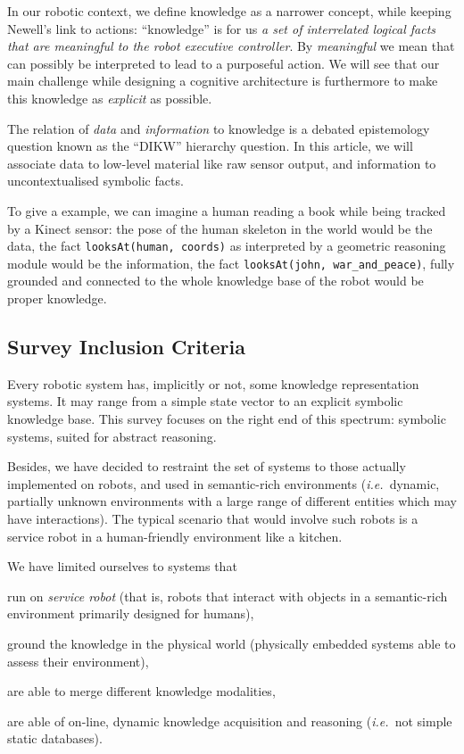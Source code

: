 \documentclass{IEEEtran}
\newcommand{\ie}{{\textit{i.e.\ }}}
\newcommand{\concept}[1]{{\footnotesize \texttt{#1}}}
\begin{document}
In our robotic context, we define knowledge as a narrower concept, while
keeping Newell's link to actions: ``knowledge'' is for us  \emph{a set of
interrelated logical facts that are meaningful to the robot executive
controller}. By \emph{meaningful} we mean that can possibly be interpreted to
lead to a purposeful action. We will see that our main challenge while
designing a cognitive architecture is furthermore to make this knowledge as
\emph{explicit} as possible.

The relation of \emph{data} and \emph{information} to knowledge is a debated
epistemology question known as the ``DIKW'' hierarchy question. In this article,
we will associate data to low-level material like raw sensor output, and
information to uncontextualised symbolic facts.

To give a example, we can imagine a human reading a book while being tracked by
a Kinect sensor: the pose of the human skeleton in the world would be the data,
the fact \concept{looksAt(human, coords)} as interpreted by a geometric reasoning
module would be the information, the fact \concept{looksAt(john,
war\_and\_peace)}, fully grounded and connected to the whole knowledge base of
the robot would be proper knowledge.

\subsection*{Survey Inclusion Criteria}
\label{sect|inclusion-criteria}

Every robotic system has, implicitly or not, some knowledge representation
systems. It may range from a simple state vector to an explicit symbolic
knowledge base.  This survey focuses on the right end of this spectrum:
symbolic systems, suited for abstract reasoning.

Besides, we have decided to restraint the set of systems to those actually
implemented on robots, and used in semantic-rich environments (\ie dynamic,
partially unknown environments with a large range of different entities which
may have interactions). The typical scenario that would involve such robots is
a service robot in a human-friendly environment like a kitchen.

We have limited ourselves to systems that
\begin{inparaenum} 
    \item  run on \emph{service robot} (that is, robots that interact with 
    objects in a semantic-rich environment primarily designed for humans),
    \item  ground the knowledge in the physical world (physically embedded
    systems able to assess their environment),
    \item  are able to merge different knowledge modalities,
    \item  are able of on-line, dynamic knowledge acquisition and reasoning 
    (\ie not simple static databases).
\end{inparaenum}
\end{document}
